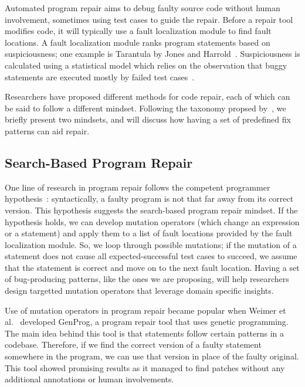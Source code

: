 Automated program repair aims to debug faulty source code without human involvement, sometimes using test cases to guide the repair. Before a repair tool modifies code, it will typically use a fault localization module to find fault locations. A fault localization module ranks program statements based on suspiciousness; one example is Tarantula by Jones and Harrold~\cite{jones2005empirical}. Suspiciousness is calculated using a statistical model which relies on the observation that buggy statements are executed mostly by failed test cases~\cite{naish2009spectral,xie2013theoretical}.

Researchers have proposed different methods for code repair, each of which can be said to follow a different mindset. Following the taxonomy propsed by~\cite{liu2018survey}, we briefly present two mindsets, and will discuss how having a set of predefined fix patterns can aid repair.

\subsection{Search-Based Program Repair}
One line of research in program repair follows the competent programmer hypothesis~\cite{gopinath2014mutant}: syntactically, a faulty program is not that far away from its correct version. This hypothesis suggests the search-based program repair mindset. If the hypothesis holds, we can develop mutation operators (which change an expression or a statement) and apply them to a list of fault locations provided by the fault localization module. So, we loop through possible mutations; if the mutation of a statement does not cause all expected-successful test cases to succeed, we assume that the statement is correct and move on to the next fault location. Having a set of bug-producing patterns, like the ones we are proposing, will help researchers design targetted mutation operators that leverage domain specific insights.

Use of mutation operators in program repair became popular when Weimer et al.~\cite{forrest2009genetic,nguyen2009using} developed GenProg, a program repair tool that uses genetic programming. The main idea behind this tool is that statements follow certain patterns in a codebase. Therefore, if we find the correct version of a faulty statement somewhere in the program, we can use that version in place of the faulty original. This tool showed promising results as it managed to find patches without any additional annotations or human involvements.

